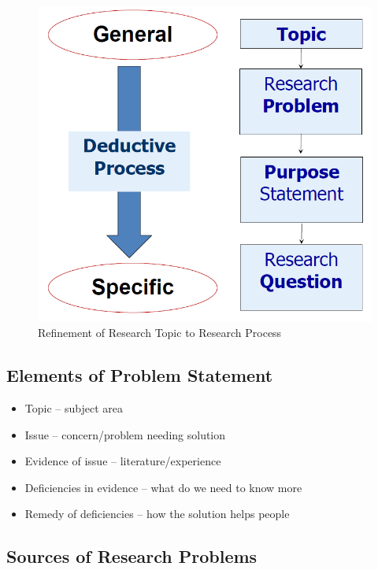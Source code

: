 \documentclass{article}
\begin{document}
\begin{figure}
\begin{center}
    \includegraphics[scale=0.25]{img/research-problem.png}
    \caption{Refinement of Research Topic to Research Process}
    \label{fig:research-problem}
    \end{center}
\end{figure}

\subsection{Elements of Problem Statement}

\begin{itemize}
    \item Topic -- subject area
    \item Issue -- concern/problem needing solution
    \item Evidence of issue -- literature/experience
    \item Deficiencies in evidence -- what do we need to know more
    \item Remedy of deficiencies -- how the solution helps people
\end{itemize}

\subsection{Sources of Research Problems}
\end{document}
